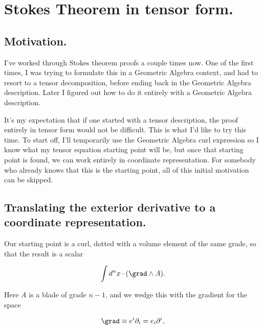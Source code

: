 
%

\chapter{Stokes Theorem in tensor form.}
\label{chap:stokesTensor}
{}
\date{Feb 20, 2011}

\beginArtWithToc

\section{Motivation.}

I've worked through Stokes theorem proofs a couple times now.  One of the first times, I was trying to formulate this in a Geometric Algebra context, and had to resort to a tensor decomposition, before ending back in the Geometric Algebra description.  Later I figured out how to do it entirely with a Geometric Algebra description.

It's my expectation that if one started with a tensor description, the proof entirely in tensor form would not be difficult.  This is what I'd like to try this time.  To start off, I'll temporarily use the Geometric Algebra curl expression so I know what my tensor equation starting point will be, but once that starting point is found, we can work entirely in coordinate representation.  For somebody who already knows that this is the starting point, all of this initial motivation can be skipped.

\section{Translating the exterior derivative to a coordinate representation.}

Our starting point is a curl, dotted with a volume element of the same grade, so that the result is a scalar

\begin{equation}\label{eqn:stokesTensor:10}
\int d^n x \cdot (\grad \wedge A).
\end{equation}

Here $A$ is a blade of grade $n-1$, and we wedge this with the gradient for the space

\begin{equation}\label{eqn:stokesTensor:30}
\grad \equiv e^i \partial_i = e_i \partial^i,
\end{equation}


